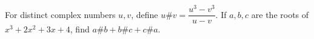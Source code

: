For distinct complex numbers $u,v$, define $u\#v=\dfrac{u^3-v^3}{u-v}$. If $a,b,c$ are the roots of $x^3+2x^2+3x+4$, find $a\#b+b\#c+c\#a$.
